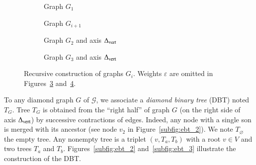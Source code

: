 \documentclass[preprint]{elsarticle}
\newcommand{\set}[1]{\left\{ #1 \right\}}
\newcommand{\card}[1]{\left| #1 \right|}
\newcommand{\mcalg}{\mathcal{G}}
\newcommand{\mts}{MS}
\newcommand{\deltavert}{\Delta_{\mbox{\scriptsize{vert}}}}
\newcommand{\ebt}{DBT}
\begin{document}
\begin{figure}[h]
\centering
\begin{subfigure}[b]{0.49\columnwidth}
\centering
\scalebox{.52}{}
\caption{Graph $G_1$}
\label{subfig:G_1}
\end{subfigure}
\begin{subfigure}[b]{0.49\columnwidth}
\centering
\scalebox{.52}{}
\caption{Graph $G_{i+1}$}
\label{subfig:G_i}
\end{subfigure}
\begin{subfigure}[b]{0.49\columnwidth}
\centering
\scalebox{.45}{}
\caption{Graph $G_2$ and axis $\deltavert$}
\label{subfig:G_2}
\end{subfigure}
\begin{subfigure}[b]{0.49\columnwidth}
\centering
\scalebox{0.45}{}
\caption{Graph $G_3$ and axis $\deltavert$}
\label{subfig:G_3}
\end{subfigure}
\caption{Recursive construction of graphs $G_i$. 
Weights $\varepsilon$ are omitted in Figures~\ref{subfig:G_2} and~\ref{subfig:G_3}.
}
\label{fig:G_i}
\end{figure}

%

To any diamond graph $G$ of $\mcalg$, we associate a \textit{diamond binary tree} (\ebt ) noted $T_G$. Tree $T_G$ is obtained from the “right half” of graph $G$ (on the right side of axis $\deltavert$) by successive contractions of edges. Indeed, any node with a single son is merged with its ancestor (see node $v_2$ in Figure~\ref{subfig:ebt_2}). 
We note $T_\varnothing$ the empty tree. Any nonempty tree is a triplet $(v, T_a, T_b)$ with a root $v \in V$ and two trees $T_a$ and $T_b$. Figures~\ref{subfig:ebt_2} and~\ref{subfig:ebt_3} illustrate the construction of the \ebt . 
\end{document}
